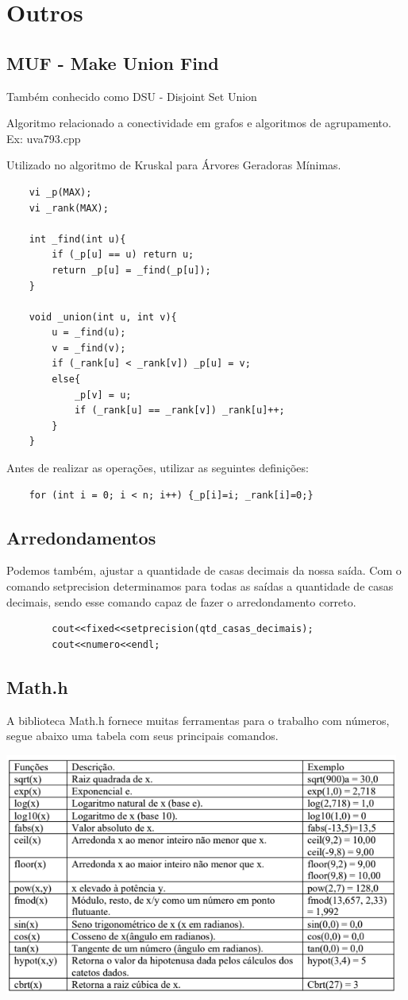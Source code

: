 \section{Outros}

\subsection{MUF - Make Union Find}
Também conhecido como DSU - Disjoint Set Union

Algoritmo relacionado a conectividade em grafos e algoritmos de agrupamento. Ex: uva793.cpp
\par Utilizado no algoritmo de Kruskal para Árvores Geradoras Mínimas.
\begin{verbatim}
    vi _p(MAX);
    vi _rank(MAX);

    int _find(int u){
        if (_p[u] == u) return u;
        return _p[u] = _find(_p[u]);
    }

    void _union(int u, int v){
        u = _find(u);
        v = _find(v);
        if (_rank[u] < _rank[v]) _p[u] = v;
        else{
            _p[v] = u;
            if (_rank[u] == _rank[v]) _rank[u]++;
        }
    }
\end{verbatim}

\par Antes de realizar as operações, utilizar as seguintes definições:
\begin{verbatim}
    for (int i = 0; i < n; i++) {_p[i]=i; _rank[i]=0;}
\end{verbatim}

\subsection{Arredondamentos}
    Podemos também, ajustar a quantidade de casas decimais da nossa saída. Com o comando
    setprecision determinamos para todas as saídas a quantidade de casas decimais, sendo 
    esse comando capaz de fazer o arredondamento correto.
    \begin{verbatim}
        cout<<fixed<<setprecision(qtd_casas_decimais);
        cout<<numero<<endl;
    \end{verbatim}  

\subsection{Math.h}
    A biblioteca Math.h fornece muitas ferramentas para o trabalho com números, segue abaixo 
    uma tabela com seus principais comandos.

    \includegraphics[width=130mm]{12_outros/ComandosMath.png}
    \pagebreak
    